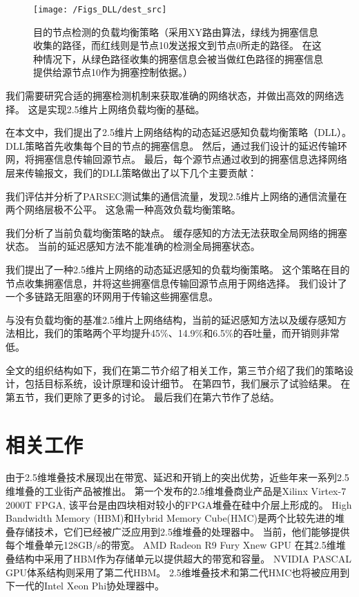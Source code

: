 \begin{figure}[htbp] %
  \centering
  \texttt{[image: /Figs\_DLL/dest\_src]}
  \caption{目的节点检测的负载均衡策略（采用XY路由算法，绿线为拥塞信息收集的路径，而红线则是节点10发送报文到节点0所走的路径。
  在这种情况下，从绿色路径收集的拥塞信息会被当做红色路径的拥塞信息提供给源节点10作为拥塞控制依据。）}
  \label{fig:dest_src}
\end{figure}

我们需要研究合适的拥塞检测机制来获取准确的网络状态，并做出高效的网络选择。
这是实现2.5维片上网络负载均衡的基础。

在本文中，我们提出了2.5维片上网络结构的动态延迟感知负载均衡策略（DLL）。
DLL策略首先收集每个目的节点的拥塞信息。
然后，通过我们设计的延迟传输环网，将拥塞信息传输回源节点。
最后，每个源节点通过收到的拥塞信息选择网络层来传输报文，我们的DLL策略做出了以下几个主要贡献：

我们评估并分析了PARSEC测试集的通信流量，发现2.5维片上网络的通信流量在两个网络层极不公平。
这急需一种高效负载均衡策略。

我们分析了当前负载均衡策略的缺点。
缓存感知的方法无法获取全局网络的拥塞状态。
当前的延迟感知方法不能准确的检测全局拥塞状态。

我们提出了一种2.5维片上网络的动态延迟感知的负载均衡策略。
这个策略在目的节点收集拥塞信息，并将这些拥塞信息传输回源节点用于网络选择。
我们设计了一个多链路无阻塞的环网用于传输这些拥塞信息。

与没有负载均衡的基准2.5维片上网络结构，当前的延迟感知方法以及缓存感知方法相比，我们的策略两个平均提升45\%、14.9\%和6.5\%的吞吐量，而开销则非常低。

全文的组织结构如下，我们在第二节介绍了相关工作，第三节介绍了我们的策略设计，包括目标系统，设计原理和设计细节。
在第四节，我们展示了试验结果。
在第五节，我们更除了更多的讨论。
最后我们在第六节作了总结。



\section{相关工作}

由于2.5维堆叠技术展现出在带宽、延迟和开销上的突出优势，近些年来一系列2.5维堆叠的工业街产品被推出。
第一个发布的2.5维堆叠商业产品是Xilinx Virtex-7 2000T FPGA, 该平台是由四块相对较小的FPGA堆叠在硅中介层上形成的。
High Bandwidth Memory (HBM)和Hybrid Memory Cube(HMC)是两个比较先进的堆叠存储技术，它们已经被广泛应用到2.5维堆叠的处理器中。
当前，他们能够提供每个堆叠单元128GB/s的带宽。
AMD Radeon R9 Fury Xnew GPU 在其2.5维堆叠结构中采用了HBM作为存储单元以提供超大的带宽和容量。
NVIDIA PASCAL GPU体系结构则采用了第二代HBM。
2.5维堆叠技术和第二代HMC也将被应用到下一代的Intel Xeon Phi协处理器中。

